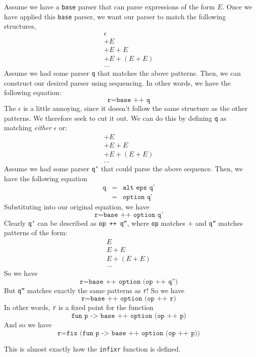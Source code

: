 Assume we have a \texttt{base} parser that can parse expressions of the form $E$. Once we have applied this \texttt{base} parser, we want our parser to match the following structures,
\[\begin{array}{l}
     \epsilon\\
     +E\\
     +E+E\\
     +E+(E+E)\\
     \ldots
\end{array}\]
Assume we had some parser \texttt{q} that matches the above patterns. Then, we can construct our desired parser using sequencing. In other words, we have the following equation:
\[\texttt{r} = \texttt{base ++ q}\]
The $\epsilon$ is a little annoying, since it doesn't follow the same structure as the other patterns. We therefore seek to cut it out. We can do this by defining \texttt{q} as matching \textit{either}
$\epsilon$ or:
\[\begin{array}{l}
     +E\\
     +E+E\\
     +E+(E+E)\\
     \ldots
\end{array}\]
Assume we had some parser \texttt{q'} that could parse the above sequence. Then, we have the following equation
\[
\begin{array}{rcl}
     \texttt{q}&=&\texttt{alt eps q'}  \\
     &=& \texttt{option q'} 
\end{array}
\]
Substituting into our original equation, we have
\[\texttt{r} = \texttt{base ++ option q'} \]
Clearly \texttt{q'} can be described as \texttt{op ++ q''}, where \texttt{op} matches $+$ and \texttt{q''} matches patterns of the form:
\[\begin{array}{l}
     E\\
     E+E\\
     E+(E+E)\\
     \ldots
\end{array}\]
So we have
\[\texttt{r} = \texttt{base ++ option (op ++ q'')}\]
But \texttt{q''} matches exactly the same patterns as \texttt{r}! So we have  
\[\texttt{r} = \texttt{base ++ option (op ++ r)}\]
In other words, \texttt{r} is a fixed point for the function
\[\texttt{fun p -> base ++ option (op ++ p)}\]
And so we have 
\[\texttt{r} = \texttt{fix (fun p -> base ++ option (op ++ p))}\]

This is almost exactly how the \texttt{infixr} function is defined.

